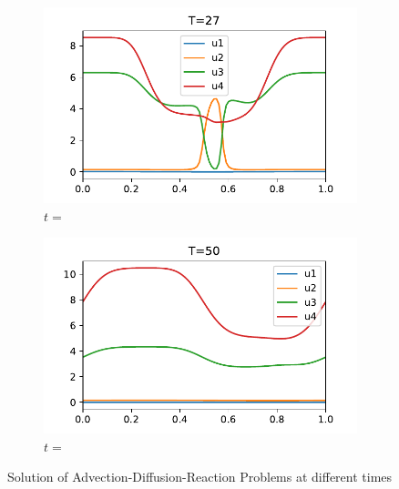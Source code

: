 \documentclass[a4paper]{article}
\numberwithin{equation}{section}
\theoremstyle{plain}
\theoremstyle{definition}
\numberwithin{theorem}{section}
\newcommand{\1}{\mathbbm{1}}
\begin{document}
\begin{figure}
    \begin{subfigure}[b]{0.49\textwidth}
        \includegraphics[width=\textwidth]{plots/ADP_sol_27.pdf}
        \caption{$t=$}
        \label{fig:sol_ADP27}
    \end{subfigure}
	\begin{subfigure}[b]{0.49\textwidth}
        \includegraphics[width=\textwidth]{plots/ADP_sol_50.pdf}
        \caption{$t=$}
        \label{fig:sol_ADP50}
    \end{subfigure}

    \caption{Solution of Advection-Diffusion-Reaction Problems at different times}\label{fig:Sol_ADP}
\end{figure}
\end{document}
